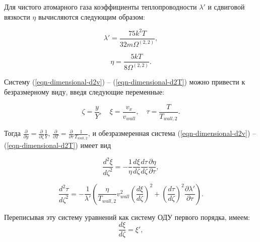 \documentclass[12pt]{article}
\begin{document}
Для чистого атомарного газа коэффициенты теплопроводности $\lambda'$ и сдвиговой вязкости $\eta$ вычисляются следующим образом:

\begin{equation}
  \lambda' = \frac{75k^2T}{32m\Omega^{(2,2)}},
\end{equation}

\begin{equation}
  \eta = \frac{5kT}{8\Omega^{(2,2)}}.
\end{equation}

Систему (\ref{eqn-dimensional-d2v}) -- (\ref{eqn-dimensional-d2T}) можно привести к безразмерному виду, введя следующие переменные:

\begin{equation}
  \zeta = \frac{y}{Y},\quad \xi = \frac{v_{x}}{v_{wall}},\quad \tau = \frac{T}{T_{wall, 2}}.
\end{equation}

Тогда $\frac{\partial }{\partial y}=\frac{\partial }{\partial \zeta}\frac{1}{Y}$, $\frac{\partial }{\partial T}=\frac{\partial }{\partial \tau}\frac{1}{T_{wall,2}}$, и обезразмеренная система (\ref{eqn-dimensional-d2v}) -- (\ref{eqn-dimensional-d2T}) имеет вид



\begin{equation}
  \frac{d^2 \xi}{d \zeta^2} = -\frac{1}{\eta}\frac{d \xi}{d \zeta}\frac{d \tau}{d \zeta}\frac{\partial \eta}{\partial \tau},
\end{equation}

\begin{equation}
  \frac{d^2 \tau}{d \zeta^2} = -\frac{1}{\lambda'}\left(\frac{\eta}{T_{wall,2}}v_{wall}^{2}\left(\frac{d \xi}{d \zeta}\right)^{2}+\left(\frac{d \tau}{d \zeta}\right)^{2}\frac{\partial \lambda'}{\partial \tau} \right).
\end{equation}

Переписывая эту систему уравнений как систему ОДУ первого порядка, имеем:
\begin{equation}
  \frac{d \xi}{d \zeta} = \xi',
\end{equation}
\end{document}
